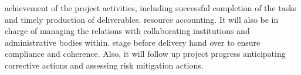 \documentclass[letterpaper,12pt]{article}
\begin{document}
% 
% 
% 
% 
% 
achievement of the project activities, including successful completion of the 
tasks and timely production of deliverables.
% 
resource accounting. It will also be in charge of managing the relations with 
collaborating institutions and administrative bodies within.
stage before delivery hand over to ensure compliance and coherence. Also, it 
will follow up project progress anticipating corrective actions and assessing 
risk mitigation actions.
% 
% 
% 
% 
\end{document}
